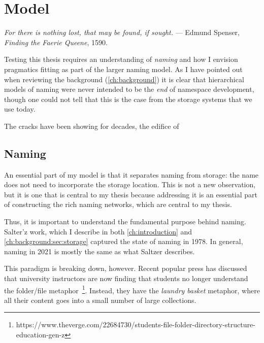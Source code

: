 \chapter{Model}
\label{ch:model}

\begin{epigraph}
    \emph{For there is nothing lost, that may be found, if sought.} --- Edmund
    Spenser, \emph{Finding the Faerie Queene}, 1590.
\end{epigraph}




\begin{quotation}
    
\end{quotation}

Testing this thesis requires an understanding of \emph{naming} and how I
envision pragmatics fitting as part of the larger naming model. As I have
pointed out when reviewing the background (\autoref{ch:background}) it is clear
that hierarchical models of naming were never intended to be the \emph{end} of
namespace development, though one could not tell that this is the case from
the storage systems that we use today.

The cracks have been showing for decades, the edifice of

\section{Naming}
\label{ch:model:sec:naming}

An essential part of my model is that it separates naming from storage: the
name does not need to incorporate the storage location.  This is not a new
observation, but it is one that is central to my thesis because addressing it is
an essential part of constructing the rich naming networks, which are central to
my thesis.

Thus, it is important to understand the fundamental purpose behind naming.
Salter'z work, which I describe in both \autoref{ch:introduction} and
\autoref{ch:background:sec:storage} captured the state of naming in 1978.  In
general, naming in 2021 is mostly the same as what Saltzer describes.

This paradigm is breaking down, however.  Recent popular press has discussed
that university instructors are now finding that students no longer understand
the folder/file
metaphor~\footnote{https://www.theverge.com/22684730/students-file-folder-directory-structure-education-gen-z}.
Instead, they have the \emph{laundry basket} metaphor, where all their content
goes into a small number of large collections.

